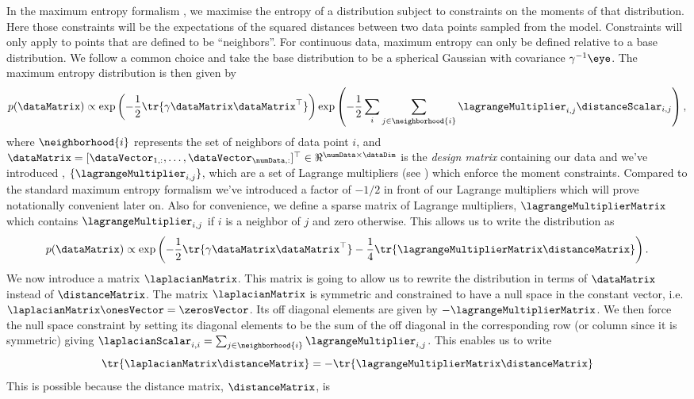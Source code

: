 In the maximum entropy formalism \citep[see e.g.][and
]{Jaynes:bayes86}, we maximise the entropy of a
distribution subject to constraints on the moments of that
distribution. Here those constraints will be the expectations of the
squared distances between two data points sampled from the
model. Constraints will only apply to points that are defined to be
``neighbors''. For continuous data, maximum entropy can only be
defined relative to a base distribution. We follow a common choice and
take the base distribution to be a spherical Gaussian with covariance
$\gamma^{-1}\eye$. The maximum entropy distribution is then given by
\[
p(\dataMatrix) \propto
\exp\left(-\frac{1}{2}\tr{\gamma\dataMatrix\dataMatrix^\top}\right)\exp\left(-\frac{1}{2}\sum_{i}\sum_{j\in\neighborhood{i}}\lagrangeMultiplier_{i,j}
  \distanceScalar_{i,j}\right),
\] 
where $\neighborhood{i}$ represents the set of neighbors of data point
$i$, and $\dataMatrix=[\dataVector_{1, :}, \dots,
\dataVector_{\numData, :}]^\top\in\Re^{\numData\times\dataDim}$ is the
\emph{design matrix} containing our data and we've introduced ,
$\{\lagrangeMultiplier_{i,j}\}$, which are a set of Lagrange
multipliers (see ) which enforce the
moment constraints. Compared to the standard maximum entropy formalism
we've introduced a factor of $-1/2$ in front of our Lagrange
multipliers which will prove notationally convenient later on. Also
for convenience, we define a sparse matrix of Lagrange multipliers,
$\lagrangeMultiplierMatrix$ which contains $\lagrangeMultiplier_{i,j}$
if $i$ is a neighbor of $j$ and zero otherwise. This allows us to
write the distribution as
\[
p(\dataMatrix) \propto
\exp\left(-\frac{1}{2}\tr{\gamma\dataMatrix\dataMatrix^\top}-\frac{1}{4}\tr{\lagrangeMultiplierMatrix
    \distanceMatrix}\right).
\] We now introduce a matrix
$\laplacianMatrix$. This matrix is going to allow us to rewrite the
distribution in terms of $\dataMatrix$ instead of
$\distanceMatrix$. The matrix $\laplacianMatrix$ is symmetric and
constrained to have a null space in the constant vector,
i.e. $\laplacianMatrix \onesVector = \zerosVector$. Its off diagonal
elements are given by $-\lagrangeMultiplierMatrix$. We then force the
null space constraint by setting its diagonal elements to be the sum
of the off diagonal in the corresponding row (or column since it is
symmetric) giving $\laplacianScalar_{i,i}=\sum_{j\in\neighborhood{i}}
\lagrangeMultiplier_{i, j}$. This enables us to write
\[
\tr{\laplacianMatrix\distanceMatrix} = -\tr{\lagrangeMultiplierMatrix\distanceMatrix}
\]
This is possible because the distance matrix, $\distanceMatrix$, is
